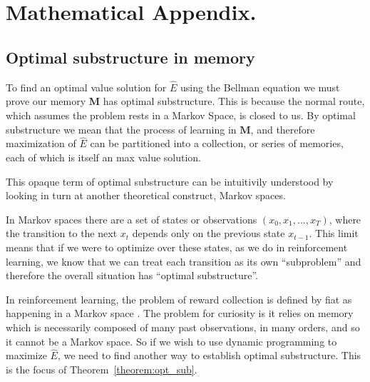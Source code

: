 \section*{Mathematical Appendix.}
\newcommand{\beginsupplement}{%
        \setcounter{table}{0}
        \renewcommand{\thetable}{S\arabic{table}}%
        \setcounter{figure}{0}
        \renewcommand{\thefigure}{S\arabic{figure}}%
     }
\beginsupplement
\setcounter{theorem}{0}

\subsection*{Optimal substructure in memory}
To find an optimal value solution for $\hat E$ using the Bellman equation we must prove our memory $\mathbf{M}$ has optimal substructure. This is because the normal route, which assumes the problem rests in a Markov Space, is closed to us. By optimal substructure we mean that the process of learning in $\mathbf{M}$, and therefore maximization of $\hat E$ can be partitioned into a collection, or series of memories, each of which is itself an max value solution.

This opaque term of optimal substructure can be intuitivily understood by looking in turn at another theoretical construct, Markov spaces. 

In Markov spaces there are a set of states or observations $(x_0, x_1, ..., x_{T})$, where the transition to the next $x_t$ depends only on the previous state $x_{t-1}$. This limit means that if we were to optimize over these states, as we do in reinforcement learning, we know that we can treat each transition as its own ``subproblem'' and therefore the overall situation has ``optimal substructure''.

In reinforcement learning, the problem of reward collection is defined by fiat as happening in a Markov space \citep{Sutton2018}. The problem for curiosity is it relies on memory which is necessarily composed of many past observations, in many orders, and so it cannot be a Markov space. So if we wish to use dynamic programming to maximize $\hat E$, we need to find another way to establish optimal substructure. This is the focus of Theorem~\ref{theorem:opt_sub}.

